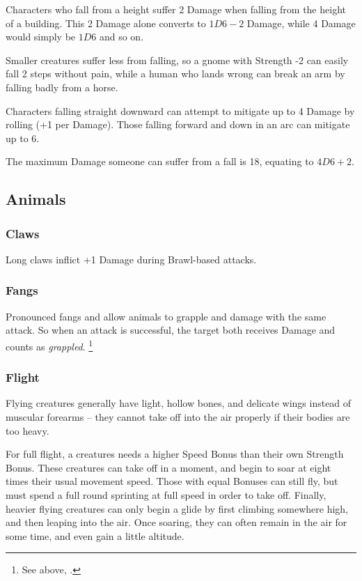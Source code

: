 \begin{multicols}{2}

Characters who fall from a height suffer 2 Damage when falling from the height of a building.
This 2 Damage alone converts to $1D6-2$ Damage, while 4 Damage would simply be $1D6$ and so on.

Smaller creatures suffer less from falling, so a gnome with Strength -2 can easily fall 2 \glspl{step} without pain, while a human who lands wrong can break an arm by falling badly from a horse.

Characters falling straight downward can attempt to mitigate up to 4 Damage by rolling  (\tn[5] +1 per Damage).
Those falling forward and down in an arc can mitigate up to 6.

The maximum Damage someone can suffer from a fall is 18, equating to $4D6+2$.

\subsection{Animals}

\subsubsection{Claws}
\label{claws}
Long claws inflict +1 Damage during Brawl-based attacks.

\subsubsection{Fangs}
\label{teeth}
\label{fangs}

Pronounced fangs and allow animals to grapple and damage with the same attack.
So when an attack is successful, the target both receives Damage and counts as \textit{grappled}.%
\footnote{See above, .}

\subsubsection{Flight}

Flying creatures generally have light, hollow bones, and delicate wings instead of muscular forearms -- they cannot take off into the air properly if their bodies are too heavy.

For full flight, a creatures needs a higher Speed Bonus than their own Strength Bonus.
These creatures can take off in a moment, and begin to soar at eight times their usual movement speed.
Those with equal Bonuses can still fly, but must spend a full round sprinting at full speed in order to take off.
Finally, heavier flying creatures can only begin a glide by first climbing somewhere high, and then leaping into the air.
Once soaring, they can often remain in the air for some time, and even gain a little altitude.


\end{multicols}
